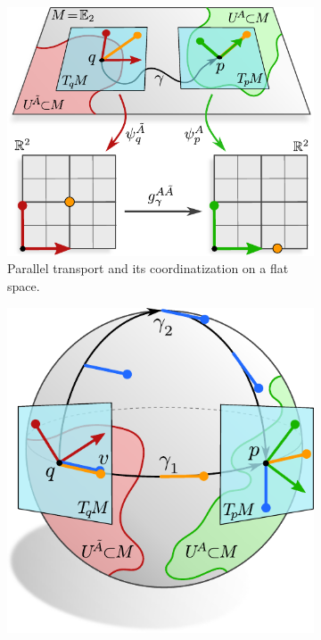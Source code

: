 \begin{figure}
    \centering
    \begin{subfigure}[b]{0.5\textwidth}
        \centering
        \includegraphics[width=.95\textwidth]{figures/transport_flat.pdf}
        \vspace*{1ex}
        \caption{\small
            Parallel transport and its coordinatization on a flat space.
        }
        \label{fig:transport_flat}
    \end{subfigure}
    \hfill
    \begin{subfigure}[b]{0.4\textwidth}
        \centering
        \includegraphics[width=\textwidth]{figures/transport_sphere.pdf}

\end{subfigure}
\end{figure}
